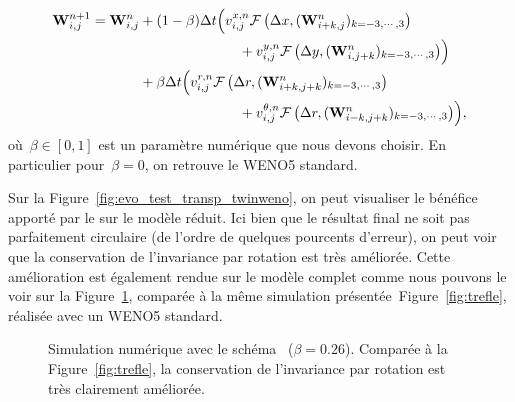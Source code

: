 \documentclass[main.tex]{subfiles}
\begin{document}
\begin{equation}\label{eq:twin-WENO5}
  \begin{split}
\W^{n+1}_{i,j} =\W^n_{i,j} &+ (1-\beta)\Delta t \Bigl(v_{i,j}^{x,n}
\mathcal{F}\left(\Delta x,(\W^n_{i+k,j})_{k=-3,\cdots, 3}\right) \\
&\hspace{25mm} + v_{i,j}^{y,n} \mathcal{F}\left(\Delta y,(\W^n_{i,j+k})_{k=-3,\cdots,3}\right)\Bigr)\\
&+\beta\Delta t \Bigl(v_{i,j}^{r,n}
\mathcal{F}\left(\Delta r,(\W^n_{i+k,j+k})_{k=-3,\cdots, 3}\right) \\
& \hspace{25mm} + v_{i,j}^{\theta,n} \mathcal{F}\left(\Delta r,(\W^n_{i-k,j+k})_{k=-3,\cdots, 3}\right)\Bigr),
  \end{split}
\end{equation}
où~$\beta\in[0,1]$ est un paramètre numérique que nous devons choisir. 
En particulier pour~$\beta=0$, on retrouve le WENO5 standard. 


Sur la Figure~\ref{fig:evo_test_transp_twinweno}, on peut visualiser le bénéfice apporté par le \twinweno sur le modèle réduit. Ici bien que le résultat final ne soit pas parfaitement circulaire (de l'ordre de quelques pourcents d'erreur), on peut voir que la conservation de l'invariance par rotation est très améliorée. Cette amélioration est également rendue sur le modèle complet comme nous pouvons le voir sur la Figure~\ref{fig:compWENO5}, comparée à la même simulation présentée~Figure~\ref{fig:trefle}, réalisée avec un WENO5 standard.

\begin{figure}[!htb]
\centering
{}
\caption{Simulation numérique avec le schéma \twinweno\  ($\beta=0.26$).  
Comparée à la Figure~\ref{fig:trefle}, la conservation de l'invariance par rotation est très clairement améliorée. 
}\label{fig:compWENO5}
\end{figure}

\end{document}
